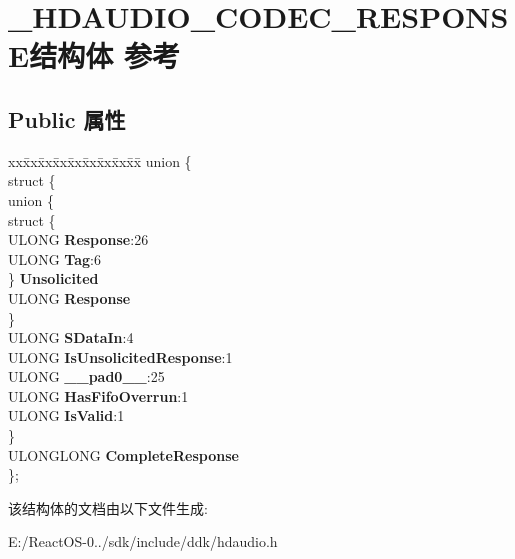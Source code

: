 \hypertarget{struct___h_d_a_u_d_i_o___c_o_d_e_c___r_e_s_p_o_n_s_e}{}\section{\+\_\+\+H\+D\+A\+U\+D\+I\+O\+\_\+\+C\+O\+D\+E\+C\+\_\+\+R\+E\+S\+P\+O\+N\+S\+E结构体 参考}
\label{struct___h_d_a_u_d_i_o___c_o_d_e_c___r_e_s_p_o_n_s_e}
\subsection*{Public 属性}
\begin{DoxyCompactItemize}
\item 
\mbox{\label{struct___h_d_a_u_d_i_o___c_o_d_e_c___r_e_s_p_o_n_s_e_a8d06dc68c86ae75b16bd10419bfc5bdd}} 
\begin{tabbing}
xx\=xx\=xx\=xx\=xx\=xx\=xx\=xx\=xx\=\kill
union \{\\
\mbox{\label{union___h_d_a_u_d_i_o___c_o_d_e_c___r_e_s_p_o_n_s_e_1_1_0D1670_a7b54784577a9a536b4fd5e279fd78c23}} 
\>struct \{\\
\mbox{\label{struct___h_d_a_u_d_i_o___c_o_d_e_c___r_e_s_p_o_n_s_e_1_1_0D1670_1_1_0D1672_ace3238b68c7c5152b9d3a8ec5b909d80}} 
\>\>union \{\\
\>\>\>struct \{\\
\>\>\>\>ULONG {\bfseries Response}:26\\
\>\>\>\>ULONG {\bfseries Tag}:6\\
\>\>\>\} {\bfseries Unsolicited}\\
\>\>\>ULONG {\bfseries Response}\\
\>\>\} \\
\>\>ULONG {\bfseries SDataIn}:4\\
\>\>ULONG {\bfseries IsUnsolicitedResponse}:1\\
\>\>ULONG {\bfseries \_\_pad0\_\_}:25\\
\>\>ULONG {\bfseries HasFifoOverrun}:1\\
\>\>ULONG {\bfseries IsValid}:1\\
\>\} \\
\>ULONGLONG {\bfseries CompleteResponse}\\
\}; \\

\end{tabbing}\end{DoxyCompactItemize}


该结构体的文档由以下文件生成\+:\begin{DoxyCompactItemize}
\item 
E\+:/\+React\+O\+S-\/0../sdk/include/ddk/hdaudio.\+h\end{DoxyCompactItemize}
